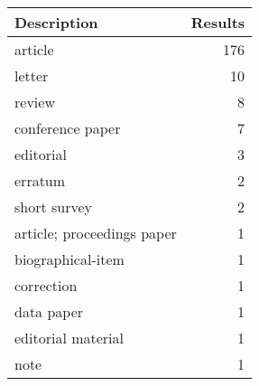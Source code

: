 
\begin{tabular}{lr}
\toprule
Description & Results\\
\midrule
article & 176\\
letter & 10\\
review & 8\\
conference paper & 7\\
editorial & 3\\
\addlinespace
erratum & 2\\
short survey & 2\\
article; proceedings paper & 1\\
biographical-item & 1\\
correction & 1\\
\addlinespace
data paper & 1\\
editorial material & 1\\
note & 1\\
\bottomrule
\end{tabular}